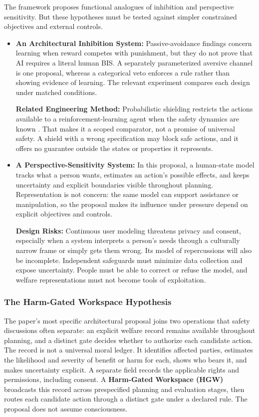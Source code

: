 \documentclass{article}
\begin{document}
The framework proposes functional analogues of inhibition and perspective sensitivity. But these hypotheses must be tested against simpler constrained objectives and external controls.
\begin{itemize}
    \item \textbf{An Architectural Inhibition System:} Passive-avoidance findings concern learning when reward competes with punishment, but they do not prove that AI requires a literal human BIS. A separately parameterized aversive channel is one proposal, whereas a categorical veto enforces a rule rather than showing evidence of learning. The relevant experiment compares each design under matched conditions.
    
    \textbf{Related Engineering Method:} Probabilistic shielding restricts the actions available to a reinforcement-learning agent when the safety dynamics are known \citep{ref41}. That makes it a scoped comparator, not a promise of universal safety. A shield with a wrong specification may block safe actions, and it offers no guarantee outside the states or properties it represents.

    \item \textbf{A Perspective-Sensitivity System:} In this proposal, a human-state model tracks what a person wants, estimates an action's possible effects, and keeps uncertainty and explicit boundaries visible throughout planning. Representation is not concern: the same model can support assistance or manipulation, so the proposal makes its influence under pressure depend on explicit objectives and controls.
    
    \textbf{Design Risks:} Continuous user modeling threatens privacy and consent, especially when a system interprets a person's needs through a culturally narrow frame or simply gets them wrong. Its model of repercussions will also be incomplete. Independent safeguards must minimize data collection and expose uncertainty. People must be able to correct or refuse the model, and welfare representations must not become tools of exploitation.
\end{itemize}

\subsubsection{The Harm-Gated Workspace Hypothesis}
The paper's most specific architectural proposal joins two operations that safety discussions often separate: an explicit welfare record remains available throughout planning, and a distinct gate decides whether to authorize each candidate action. The record is not a universal moral ledger. It identifies affected parties, estimates the likelihood and severity of benefit or harm for each, shows who bears it, and makes uncertainty explicit. A separate field records the applicable rights and permissions, including consent. A \textbf{Harm-Gated Workspace (HGW)} broadcasts this record across prespecified planning and evaluation stages, then routes each candidate action through a distinct gate under a declared rule. The proposal does not assume consciousness.
\end{document}
